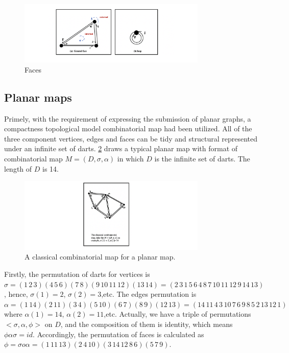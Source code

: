 \begin{figure}[htb]
  \centering
  \includegraphics[width=0.8\textwidth]{../../image/face.png}
  \caption{Faces}
  \label{fig:figures:faces}
\end{figure}

\subsection{Planar maps}
Primely, with the requirement of expressing the submission of planar graphs, a compactness topological model  combinatorial map had been utilized. All of  the three component vertices, edges and faces can be tidy and structural represented under an infinite set of darts. \cref{fig:figures:map} draws a typical planar map with format of combinatorial map \(M=(D,\sigma,\alpha)\) in which \(D\) is the infinite set of darts. The length of \(D\) is 14. 

\begin{figure}[htb]
  \centering
  \includegraphics[width=0.8\textwidth]{../../image/map.png}
  \caption{A classical  combinatorial map for a planar map.}
  \label{fig:figures:map}
\end{figure}

Firstly, the permutation of darts for vertices is \(\sigma=(1\,2\,3)(4\,5\,6)(7\,8)(9\,10\,11\,12)(13\,14)=(2\,3\,1\,5\,6\,4\,8\,7\,10\,11\,12\,9\,14\,13)\) , hence, \(\sigma(1)=2\), \(\sigma(2)=3\),etc. The edges permutation is \(\alpha=(1\,14)(2\,11)(3\,4)(5\,10)(6\,7)(8
\,9)(12\,13)=(14\,11\,4\,3\,10\,7\,6\,9\,8\,5\,2\,13\,12\,1)\) where \(\alpha(1)=14\), \(\alpha(2)=11\),etc. Actually, we have a triple of permutations \(<\sigma,\alpha,\phi>\) on \(D\), and the composition of them is identity, which means \(\phi\alpha\sigma=id\). Accordingly, the permutation of faces is calculated as \(\phi=\sigma o \alpha=(1\,11\,13)(2\,4\,10)(3\,14\,12\,8\,6)(5\,7\,9)\).

